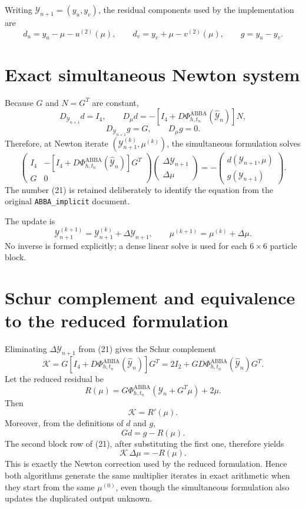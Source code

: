 \documentclass[11pt,a4paper]{article}
\newcommand{\Id}{I}
\newcommand{\Y}{\mathcal{Y}}
\newcommand{\PhiAB}{\Phi^{\mathrm{ABBA}}_{h,t_n}}
\begin{document}
Writing $\Y_{n+1}=(y_u,y_v)$, the residual components used by the implementation are
\[
 d_u=y_u-\mu-u^{(2)}(\mu),
 \qquad
 d_v=y_v+\mu-v^{(2)}(\mu),
 \qquad
 g=y_u-y_v.
\]

\section{Exact simultaneous Newton system}

Because $G$ and $N=G^T$ are constant,
\[
 D_{\Y_{n+1}}d=\Id_4,
 \qquad
 D_\mu d=-\left[\Id_4+D\PhiAB(\widehat{\Y}_n)\right]N,
\]
\[
 D_{\Y_{n+1}}g=G,
 \qquad
 D_\mu g=0.
\]
Therefore, at Newton iterate $(\Y_{n+1}^{(k)},\mu^{(k)})$, the simultaneous formulation
solves
\[
 \boxed{
 \begin{pmatrix}
  \Id_4&-\left[\Id_4+D\PhiAB(\widehat{\Y}_n)\right]G^T\\[2pt]
  G&0
 \end{pmatrix}
 \begin{pmatrix}
  \Delta\Y_{n+1}\\
  \Delta\mu
 \end{pmatrix}
 =-
 \begin{pmatrix}
  d(\Y_{n+1},\mu)\\
  g(\Y_{n+1})
 \end{pmatrix}.
 } \tag{21}
\]
The number (21) is retained deliberately to identify the equation from the
original \texttt{ABBA\_implicit} document.

The update is
\[
 \Y_{n+1}^{(k+1)}=\Y_{n+1}^{(k)}+\Delta\Y_{n+1},
 \qquad
 \mu^{(k+1)}=\mu^{(k)}+\Delta\mu.
\]
No inverse is formed explicitly; a dense linear solve is used for each
$6\times6$ particle block.

\section{Schur complement and equivalence to the reduced formulation}

Eliminating $\Delta\Y_{n+1}$ from (21) gives the Schur complement
\[
 \mathcal K
 =G\left[\Id_4+D\PhiAB(\widehat{\Y}_n)\right]G^T
 =2\Id_2+GD\PhiAB(\widehat{\Y}_n)G^T.
\]
Let the reduced residual be
\[
 R(\mu)=G\PhiAB(\Y_n+G^T\mu)+2\mu.
\]
Then
\[
 \mathcal K=R'(\mu).
\]
Moreover, from the definitions of $d$ and $g$,
\[
 Gd=g-R(\mu).
\]
The second block row of (21), after substituting the first one, therefore yields
\[
 \mathcal K\,\Delta\mu=-R(\mu).
\]
This is exactly the Newton correction used by the reduced formulation. Hence both
algorithms generate the same multiplier iterates in exact arithmetic when they start
from the same $\mu^{(0)}$, even though the simultaneous formulation also updates the duplicated
output unknown.
\end{document}
